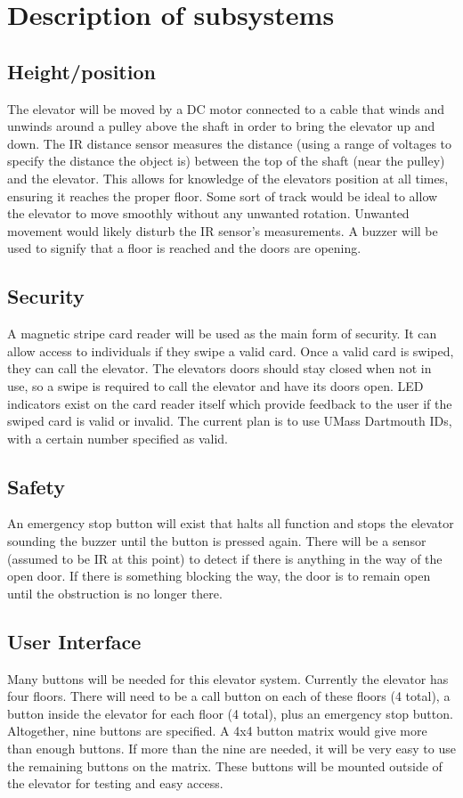\documentclass{article}
\begin{document}
	\section{Description of subsystems}
	    \subsection{Height/position}
	    The elevator will be moved by a DC motor connected to a cable that winds and unwinds around a pulley above the shaft in order to bring the elevator up and down. The IR distance sensor measures the distance (using a range of voltages to specify the distance the object is) between the top of the shaft (near the pulley) and the elevator. This allows for knowledge of the elevators position at all times, ensuring it reaches the proper floor. Some sort of track would be ideal to allow the elevator to move smoothly without any unwanted rotation. Unwanted movement would likely disturb the IR sensor's measurements. A buzzer will be used to signify that a floor is reached and the doors are opening.
	    
	    \subsection{Security}
	    A magnetic stripe card reader will be used as the main form of security. It can allow access to individuals if they swipe a valid card. Once a valid card is swiped, they can call the elevator. The elevators doors should stay closed when not in use, so a swipe is required to call the elevator and have its doors open. LED indicators exist on the card reader itself which provide feedback to the user if the swiped card is valid or invalid. The current plan is to use UMass Dartmouth IDs, with a certain number specified as valid.
	    
	    \subsection{Safety}
	    An emergency stop button will exist that halts all function and stops the elevator sounding the buzzer until the button is pressed again. There will be a sensor (assumed to be IR at this point) to detect if there is anything in the way of the open door. If there is something blocking the way, the door is to remain open until the obstruction is no longer there.
	    
	    \subsection{User Interface}
	    Many buttons will be needed for this elevator system. Currently the elevator has four floors. There will need to be a call button on each of these floors (4 total), a button inside the elevator for each floor (4 total), plus an emergency stop button. Altogether, nine buttons are specified. A 4x4 button matrix would give more than enough buttons. If more than the nine are needed, it will be very easy to use the remaining buttons on the matrix. These buttons will be mounted outside of the elevator for testing and easy access.
	    
\end{document}
